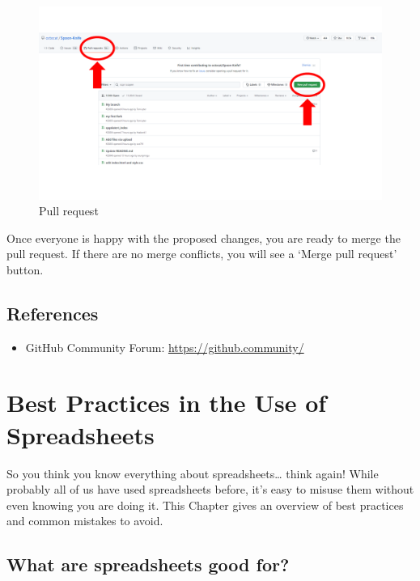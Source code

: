 \documentclass[
]{book}
\providecommand{\tightlist}{%
  \setlength{\itemsep}{0pt}\setlength{\parskip}{0pt}}
\begin{document}
\begin{figure}

{\centering \includegraphics[width=1\linewidth]{img/github-04} 

}

\caption{Pull request}\label{fig:github04}
\end{figure}

Once everyone is happy with the proposed changes, you are ready to merge the pull request. If there are no merge conflicts, you will see a `Merge pull request' button.

\hypertarget{references-2}{%
\section{References}\label{references-2}}

\begin{itemize}
\tightlist
\item
  GitHub Community Forum: \url{https://github.community/}
\end{itemize}

\hypertarget{spreadsheets}{%
\chapter{Best Practices in the Use of Spreadsheets}\label{spreadsheets}}

So you think you know everything about spreadsheets\ldots{} think again! While probably all of us have used spreadsheets before, it's easy to misuse them without even knowing you are doing it. This Chapter gives an overview of best practices and common mistakes to avoid.

\hypertarget{what-are-spreadsheets-good-for}{%
\section{What are spreadsheets good for?}\label{what-are-spreadsheets-good-for}}
\end{document}
